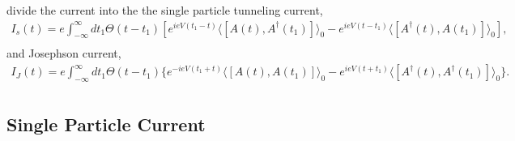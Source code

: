\documentclass[11pt]{article}
\begin{document}
divide the current into the the single particle tunneling current,
\begin{eqnarray}
I_s(t)=e \int_{-\infty}^{\infty} dt_1 \Theta(t-t_1)
\left[e^{ieV(t_1-t)} \langle  [A(t),A^{\dagger}(t_1)] \rangle_0 -e^{ieV(t-t_1)} \langle  [A^{\dagger}(t),A(t_1)] \rangle_0 
\right],
\nonumber \\
\end{eqnarray} and Josephson current, \begin{eqnarray}
I_J(t)=e \int_{-\infty}^{\infty} dt_1 \Theta(t-t_1) \{
e^{-ieV(t_1+t)} \langle  [A(t),A(t_1)] \rangle_0 -e^{ieV(t+t_1)} \langle  [A^{\dagger}(t),A^{\dagger}(t_1)] \rangle_0 \}. \nonumber \\
\end{eqnarray}

    \hypertarget{single-particle-current}{%
\subsection{Single Particle Current}\label{single-particle-current}}
\end{document}
